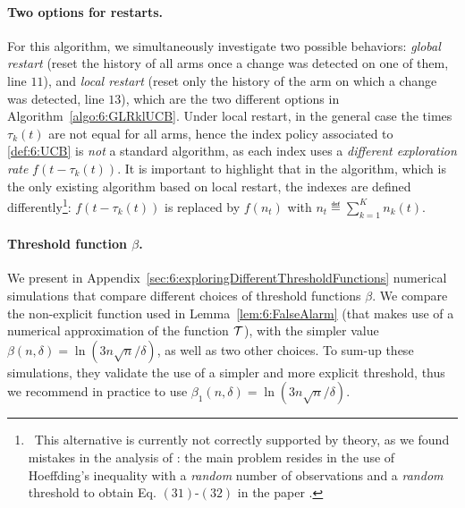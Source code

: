 \paragraph{Two options for restarts.}
%
For this algorithm, we simultaneously investigate two possible behaviors:
\emph{global restart} (reset the history of all arms once a change was detected on one of them, line $11$), and \emph{local restart} (reset only the history of the arm on which a change was detected, line $13$), which are the two different options in Algorithm~\ref{algo:6:GLRklUCB}.
%
Under local restart, in the general case the times $\tau_k(t)$ are not equal for all arms, hence the index policy associated to \eqref{def:6:UCB} is \emph{not} a standard \UCB{} algorithm, as each index uses a \emph{different exploration rate} $f(t - \tau_k(t))$.
%
It is important to highlight that in the \CUSUMUCB{} algorithm, which is the only existing algorithm based on local restart, the \UCB{} indexes are defined differently\footnote{~This alternative is currently not correctly supported by theory, as we found mistakes in the analysis of \CUSUMUCB: the main problem resides in the use of Hoeffding's inequality with a \emph{random} number of observations and a \emph{random} threshold to obtain Eq. $(31)$-$(32)$ in the paper \cite{LiuLeeShroff17}.}:
$f(t-\tau_k(t))$ is replaced by $f(n_t)$ with $n_t \eqdef \sum_{k=1}^K n_k(t)$.


\paragraph{Threshold function $\beta$.}
%
We present in Appendix~\ref{sec:6:exploringDifferentThresholdFunctions} numerical simulations that compare different choices of threshold functions $\beta$.
We compare the non-explicit function used in Lemma~\ref{lem:6:FalseAlarm} (that makes use of a numerical approximation of the function $\mathcal{T}$),
with the simpler value $\beta(n,\delta) = \ln(3n\sqrt{n}/\delta)$, as well as two other choices.
To sum-up these simulations, they validate the use of a simpler and more explicit threshold, thus we recommend in practice to use $\beta_1(n,\delta) = \ln(3n\sqrt{n}/\delta)$.



